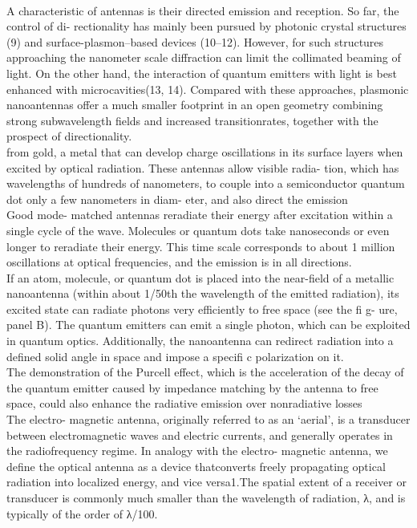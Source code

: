 	\\
	A characteristic of antennas is their directed emission and reception. So far, the control of di- rectionality has mainly been pursued by photonic crystal structures (9) and surface-plasmon–based devices (10–12). However, for such structures approaching the nanometer scale diffraction can limit the collimated beaming of light. On the other hand, the interaction of quantum emitters with light is best enhanced with microcavities(13, 14). Compared with these approaches, plasmonic nanoantennas offer a much smaller footprint in an open geometry combining strong subwavelength fields and increased transitionrates, together with the prospect of directionality.
	\\
	\cite{Giessen2010}
	from gold, a metal that can develop charge oscillations in its surface layers when excited by optical radiation. These antennas allow visible radia- tion, which has wavelengths of hundreds of nanometers, to couple into a semiconductor quantum dot only a few nanometers in diam- eter, and also direct the emission
	\\
	Good mode- matched antennas reradiate their energy after excitation within a single cycle of the wave. Molecules or quantum dots take nanoseconds or even longer to reradiate their energy. This time scale corresponds to about 1 million oscillations at optical frequencies, and the emission is in all directions.
	\\
	If an atom, molecule, or quantum dot is placed into the near-field of a metallic nanoantenna (within about 1/50th the wavelength of the emitted radiation), its excited state can radiate photons very efficiently to free space (see the fi g- ure, panel B). The quantum emitters can emit a single photon, which can be exploited in quantum optics. Additionally, the nanoantenna can redirect radiation into a defined solid angle in space and impose a specifi c polarization on it.
	\\
	The demonstration of the Purcell effect, which is the acceleration of the decay of the quantum emitter caused by impedance matching by the antenna to free space, could also enhance the radiative emission over nonradiative losses
	\\
	\cite{Novotny2011}
	The electro- magnetic antenna, originally referred to as an ‘aerial’, is a transducer between electromagnetic waves and electric currents, and generally operates in the radiofrequency regime. In analogy with the electro- magnetic antenna, we define the optical antenna as a device thatconverts freely propagating optical radiation into localized energy, and vice versa1.The spatial extent of a receiver or transducer is commonly much smaller than the wavelength of radiation, λ, and is typically of the order of λ/100.
